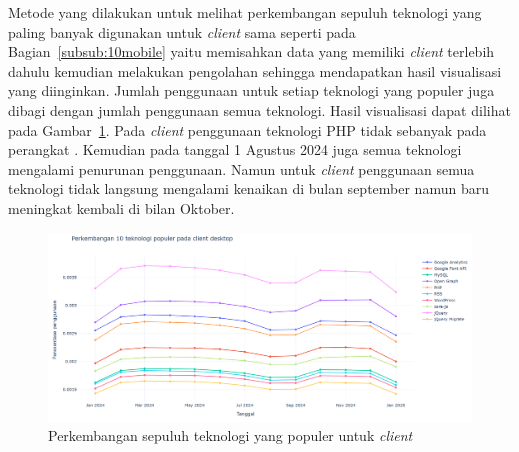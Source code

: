 Metode yang dilakukan untuk melihat perkembangan sepuluh teknologi yang paling banyak digunakan untuk \textit{client} \desktop sama seperti pada Bagian~\ref{subsub:10mobile} yaitu memisahkan data yang memiliki \textit{client} \desktop terlebih dahulu kemudian melakukan pengolahan sehingga mendapatkan hasil visualisasi yang diinginkan. Jumlah penggunaan untuk setiap teknologi yang populer juga dibagi dengan jumlah penggunaan semua teknologi. Hasil visualisasi dapat dilihat pada Gambar~\ref{fig:10dekstop}. Pada \textit{client} \desktop penggunaan teknologi PHP tidak sebanyak pada perangkat \mobile. Kemudian pada tanggal 1 Agustus 2024 juga semua teknologi mengalami penurunan penggunaan. Namun untuk \textit{client} \desktop penggunaan semua teknologi tidak langsung mengalami kenaikan di bulan september namun baru meningkat kembali di bilan Oktober.
\begin{figure}[H]
    \centering
    \includegraphics[width=0.7\linewidth]{Gambar/Perkembangan 10 teknologi pada desktop.png}
    \caption{Perkembangan sepuluh teknologi yang populer untuk \textit{client} \desktop}
    \label{fig:10dekstop}
\end{figure}
